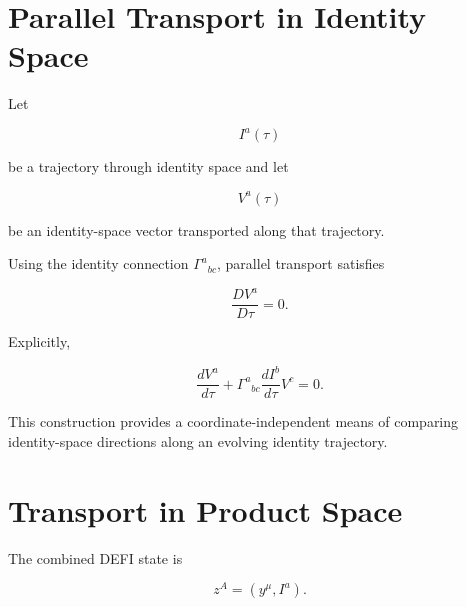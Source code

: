 \documentclass[12pt,oneside]{book}
\begin{document}

\section{Parallel Transport in Identity Space}
\label{sec:parallel-transport-identity-space}

Let

\begin{equation}
    I^a(\tau)
\end{equation}

be a trajectory through identity space and let

\begin{equation}
    V^a(\tau)
\end{equation}

be an identity-space vector transported along that trajectory.

Using the identity connection
\(\Gamma^a{}_{bc}\), parallel transport satisfies

\begin{equation}
    \frac{D V^a}{D\tau}
    =
    0.
    \label{eq:identity-parallel-transport}
\end{equation}

Explicitly,

\begin{equation}
    \frac{dV^a}{d\tau}
    +
    \Gamma^a{}_{bc}
    \frac{dI^b}{d\tau}
    V^c
    =
    0.
    \label{eq:identity-parallel-transport-expanded}
\end{equation}

This construction provides a coordinate-independent means of
comparing identity-space directions along an evolving identity
trajectory.


\section{Transport in Product Space}
\label{sec:product-space-transport}

The combined DEFI state is

\begin{equation}
    z^A
    =
    \left(
        y^\mu,
        I^a
    \right).
\end{equation}
\end{document}
